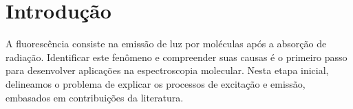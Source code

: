 \section{Introdu\c{c}\~ao}
A fluoresc\^encia consiste na emiss\~ao de luz por mol\'eculas ap\'os a absor\c{c}\~ao de radia\c{c}\~ao. Identificar este fen\^omeno e compreender suas causas \'e o primeiro passo para desenvolver aplica\c{c}\~oes na espectroscopia molecular. Nesta etapa inicial, delineamos o problema de explicar os processos de excita\c{c}\~ao e emiss\~ao, embasados em contribui\c{c}\~oes da literatura.
